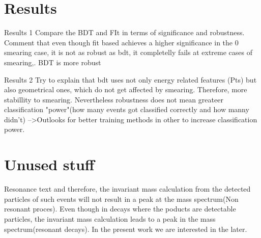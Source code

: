 \documentclass[bigger]{beamer}
\begin{document}
\section{Results}
\label{sec:org96406ef}
\begin{frame}[label={sec:org58764e7}]{Results 1}
Compare the BDT and FIt in terms of significance and robustness. Comment that even though fit based achieves a higher significance in the 0 smearing case, it is not as robust as bdt, it completelly fails at extreme cases of smearing,. BDT is more robust 
\end{frame}
\begin{frame}[label={sec:org8e67c7d}]{Results 2}
Try to explain that bdt uses not only energy related features (Pts) but also geometrical ones, which do not get affected by smearing. Therefore, more stabillity to smearing. Nevertheless robustness does not mean greateer classification "power"(how many events got classified correctly and how manny didn't) -->Outlooks for better training methods in other to increase classification power.   
\end{frame}
\section{Unused stuff}
\label{sec:orga7db2b1}
\begin{frame}[label={sec:org1d43604}]{Resonance text}
and therefore, the invariant mass calculation from the detected particles of such events will not result in a peak at the mass spectrum(Non resonant proces). Even though in decays where  the poducts are detectable particles, the invariant mass calculation leads to a peak in the mass spectrum(resonant decays). In the present work we are interested in the later.
\end{frame}
\end{document}
